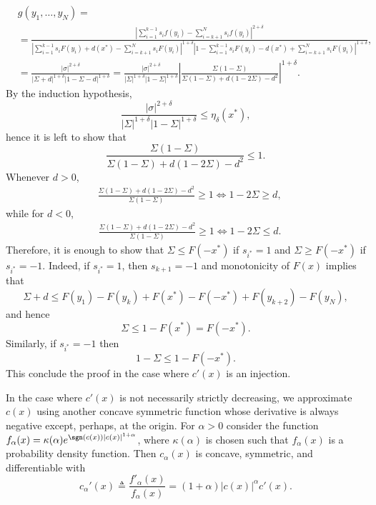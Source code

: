 \begin{align*}
& g(y_1,\ldots,y_N) =\nonumber  \\ 
& =
\frac{ \left| \sum_{i=1}^{k-1} s_i f(y_i) - \sum_{i=k+1}^{N} s_i f(y_i) \right|^{2+\delta}} 
{\left| \sum_{i=1}^{k-1} s_i F(y_i) + d(x^*) - \sum_{i=k+1}^{N} s_i F(y_i) \right|^{1+\delta} \left|1- \sum_{i=1}^{k-1} s_i F(y_i) - d(x^*) + \sum_{i=k+1}^{N} s_i F(y_i)   \right|^{1+\delta} }, \\
& = \frac{ \left| \sigma \right|^{2+\delta}} 
{\left| \Sigma+d \right|^{1+\delta} \left|1- \Sigma - d \right|^{1+\delta} }  =  
\frac{ \left| \sigma \right|^{2+\delta}} 
{\left| \Sigma \right|^{1+\delta} \left|1- \Sigma \right|^{1+\delta} }  \left| \frac{\Sigma(1-\Sigma) } { \Sigma(1-\Sigma) + d(1-2\Sigma)-d^2} \right|^{1+\delta}. 
\end{align*}
By the induction hypothesis,
\[
\frac{ \left| \sigma \right|^{2+\delta}} 
{\left| \Sigma \right|^{1+\delta} \left|1- \Sigma \right|^{1+\delta} } \leq \eta_\delta(x^*), 
\]
hence it is left to show that 
\[
 \frac{\Sigma(1-\Sigma) } { \Sigma(1-\Sigma) + d(1-2\Sigma)-d^2} \leq 1.
\]
Whenever $d>0$, 
\begin{align*}
& \frac{ \Sigma(1-\Sigma) + d(1-2\Sigma)-d^2} {\Sigma(1-\Sigma)} \geq 1 \Leftrightarrow  1-2\Sigma \geq d, 
\end{align*}
while for $d<0$,
\begin{align*}
& \frac{ \Sigma(1-\Sigma) + d(1-2\Sigma)-d^2} {\Sigma(1-\Sigma)} \geq 1 \Leftrightarrow  1-2\Sigma \leq d. 
\end{align*}
Therefore, it is enough to show that $\Sigma \leq F(-x^*)$ if $s_{i^*}=1$ and 
$\Sigma \geq F(-x^*)$ if $s_{i^*}=-1$. 
%
Indeed, if $s_{i^*}=1$, then $s_{k+1}=-1$ and monotonicity of $F(x)$ implies that 
\[
\Sigma + d \leq F(y_1) - F(y_k) + F(x^*) - F(-x^*) + F(y_{k+2}) - F(y_N), 
\]
and hence
\[
\Sigma \leq 1-F(x^*) = F(-x^*). 
\]
Similarly, if $s_{i^*}=-1$ then 
\[
1 - \Sigma \leq 1 -  F(-x^*).
\]
This conclude the proof in the case where $c'(x)$ is an injection. 
\par  
In the case where $c'(x)$ is not necessarily strictly decreasing, we approximate $c(x)$ using another concave symmetric function whose derivative is always negative except, perhaps, at the origin. For $\alpha>0$ consider the function  $f_\alpha(x) = \kappa(\alpha) e^{\sgn(c(x))|c(x)|^{1+\alpha}}$, where $\kappa(\alpha)$ is chosen such that $f_\alpha(x)$ is a probability density function. Then $c_\alpha(x)$ is concave, symmetric, and differentiable with
\[
c_\alpha'(x) \triangleq \frac{f'_\alpha(x)}{f_\alpha(x)} = (1+\alpha)|c(x)|^{\alpha} c'(x). 
\]
